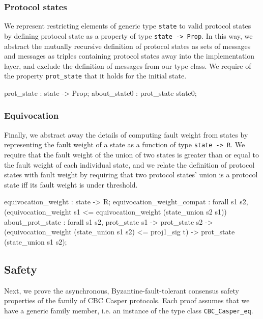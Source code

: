 \documentclass[runningheads]{llncs}
\begin{document}
\subsubsection{Protocol states}
We represent restricting elements of generic type \verb|state| to valid protocol states by defining protocol state as a property of type \verb|state -> Prop|. In this way, we abstract the mutually recursive definition of protocol states as sets of messages and messages as triples containing protocol states away into the implementation layer, and exclude the definition of messages from our type class. We require of the property \verb|prot_state| that it holds for the initial state. 
\begin{coq}
	prot_state : state -> Prop; 
	about_state0 : prot_state state0; 
\end{coq}

\subsubsection{Equivocation} 
Finally, we abstract away the details of computing fault weight from states by representing the fault weight of a state as a function of type \verb|state -> R|. We require that the fault weight of the union of two states is greater than or equal to the fault weight of each individual state, and we relate the definition of protocol states with fault weight by requiring that two protocol states' union is a protocol state iff its fault weight is under threshold. 
\begin{coq}
	equivocation_weight : state -> R; 
	equivocation_weight_compat : forall s1 s2, 
	(equivocation_weight s1 <= equivocation_weight (state_union s2 s1))%
	about_prot_state : forall s1 s2, prot_state s1 -> prot_state s2 ->
										(equivocation_weight (state_union s1 s2) <= proj1_sig t)%
										-> prot_state (state_union s1 s2);
\end{coq}

\subsection{Safety} 
Next, we prove the asynchronous, Byzantine-fault-tolerant consensus safety properties of the family of CBC Casper protocols. Each proof assumes that we have a generic family member, i.e. an instance of the type class \verb|CBC_Casper_eq|. 
\end{document}

